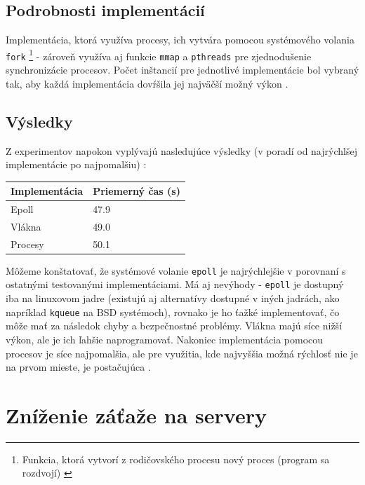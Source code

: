 \documentclass[10pt,twoside,slovak,a4paper]{article}
\begin{document}
\subsection{Podrobnosti implementácií}

Implementácia, ktorá využíva procesy, ich vytvára pomocou systémového volania \texttt{fork} \footnote{Funkcia, ktorá vytvorí z rodičovského procesu nový proces (program sa rozdvojí) \cite{kerrisk2010linux}} - zároveň využíva aj funkcie \texttt{mmap} a \texttt{pthreads} pre zjednodušenie synchronizácie procesov. Počet inštancií pre jednotlivé implementácie bol vybraný tak, aby každá implementácia dovŕšila jej najväčší možný výkon \cite{9648837}.

\subsection{Výsledky}

Z experimentov napokon vyplývajú nasledujúce výsledky (v poradí od najrýchlšej implementácie po najpomalšiu) \cite{9648837}:

\begin{center}
    \begin{tabular}{|l|l|}
        \hline
        Implementácia & Priemerný čas (s) \\ \hline
        Epoll         & 47.9              \\ \hline
        Vlákna        & 49.0              \\ \hline
        Procesy       & 50.1              \\ \hline
    \end{tabular}
\end{center}

Môžeme konštatovať, že systémové volanie \texttt{epoll} je najrýchlejšie v porovnaní s ostatnými testovanými implementáciami. Má aj nevýhody - \texttt{epoll} je dostupný iba na linuxovom jadre (existujú aj alternatívy dostupné v iných jadrách, ako napríklad \texttt{kqueue} na BSD systémoch), rovnako je ho ťažké implementovať, čo môže mať za následok chyby a bezpečnostné problémy. Vlákna majú síce nižší výkon, ale je ich ľahšie naprogramovať. Nakoniec implementácia pomocou procesov je síce najpomalšia, ale pre využitia, kde najvyššia možná rýchlosť nie je na prvom mieste, je postačujúca \cite{9648837}.

\section{Zníženie záťaže na servery}
\end{document}
